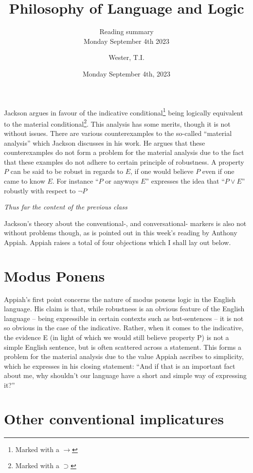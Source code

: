 \documentclass[12pt]{article}
\title{Philosophy of Language and Logic}
\subtitle{Reading summary\\Monday September 4th 2023}
\date{Monday September 4th, 2023}
\author{Wester, T.I.}
\begin{document}
\maketitle

Jackson argues in favour of the indicative conditional\footnote{ Marked with a
$\rightarrow$} being logically equivalent to the material
conditional\footnote{Marked with a $\supset$}. This analysis has some merits,
though it is not without issues. There are various counterexamples to the
so-called ``material analysis'' which Jackson discusses in his work. He argues
that these counterexamples do not form a problem for the material analysis due
to the fact that these examples do not adhere to certain principle of
robustness. A property $P$ can be said to be robust in regards to $E$, if one
would believe $P$ even if one came to know $E$. For instance ``$P$ or anyways
$E$'' expresses the idea that ``$P \lor E$'' robustly with respect to $\neg P$

\begin{center}
	\textit{Thus far the content of the previous class}
\end{center}
Jackson's theory about the conventional-, and conversational- markers is also
not without problems though, as is pointed out in this week's reading by Anthony
Appiah. Appiah raises a total of four objections which I shall lay out below.

\section{Modus Ponens}

Appiah's first point concerns the nature of modus ponens logic in the English
language. His claim is that, while robustness is an obvious feature of the
English language -- being expressible in certain contexts such as but-sentences
-- it is not so obvious in the case of the indicative. Rather, when it comes to
the indicative, the evidence E (in light of which we would still believe
property P) is not a simple English sentence, but is often scattered across a
statement. This forms a problem for the material analysis due to the value
Appiah ascribes to simplicity, which he expresses in his closing statement:
``And if that is an important fact about me, why shouldn't our language have a
short and simple way of expressing it?''

\section{Other conventional implicatures}
\end{document}
